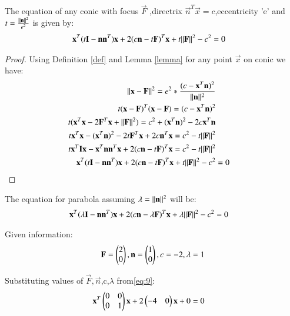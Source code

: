 \documentclass[journal,12pt,twocolumn]{IEEEtran}
\begin{document}
\begin{theorem}
The equation of any conic with focus $\vec{F}$ ,directrix $\vec{n}^T\vec{x}=c$,eccentricity 'e' and $t=\frac{\Vert\mathbf{n}\rVert^2}{e^2}$ is given by:
\begin{align}
\mathbf{x}^T(t\mathbf{I}-\mathbf{n}\mathbf{n}^T)\mathbf{x}+2(c\mathbf{n}-t\mathbf{F})^T\mathbf{x}+t\Vert\mathbf{F}\rVert^2-c^2&=0
\end{align}
\end{theorem}

\begin{proof}

Using Definition \ref{def} and Lemma \ref{lemma} for any point $\vec{x}$ on conic we have:
\begin{align}
\Vert\mathbf{x}-\mathbf{F}\rVert^2=e^2*\frac{({c-\mathbf{x}^T\mathbf{n}})^2}{\Vert\mathbf{n}\rVert^2}\label{eq:1} \\
t(\mathbf{x}-\mathbf{F})^T(\mathbf{x}-\mathbf{F})=(c-\mathbf{x}^T\mathbf{n})^2
\\
t(\mathbf{x}^T\mathbf{x}-2\mathbf{F}^T\mathbf{x}+\Vert\mathbf{F}\rVert^2)=c^2+(\mathbf{x}^T\mathbf{n})^2-2c\mathbf{x}^T\mathbf{n}\\
t\mathbf{x}^T\mathbf{x}-(\mathbf{x}^T\mathbf{n})^2-2t\mathbf{F}^T\mathbf{x}+2c\mathbf{n}^T\mathbf{x}=c^2-t\Vert\mathbf{F}\rVert^2\\
t\mathbf{x}^T\mathbf{I}\mathbf{x}-\mathbf{x}^T\mathbf{n}\mathbf{n}^T\mathbf{x}+2(c\mathbf{n}-t\mathbf{F})^T\mathbf{x}=c^2-t\Vert\mathbf{F}\rVert^2\\
\mathbf{x}^T(t\mathbf{I}-\mathbf{n}\mathbf{n}^T)\mathbf{x}+2(c\mathbf{n}-t\mathbf{F})^T\mathbf{x}+t\Vert\mathbf{F}\rVert^2-c^2&=0
\end{align}
\end{proof}
\begin{corollary}
The equation for parabola assuming $\lambda=\Vert\mathbf{n}\rVert^2$ will be: 
\begin{align}
\mathbf{x}^T(\lambda\mathbf{I}-\mathbf{n}\mathbf{n}^T)\mathbf{x}+2(c\mathbf{n}-\lambda\mathbf{F})^T\mathbf{x}+\lambda\Vert\mathbf{F}\rVert^2-c^2&=0\label{eq:8}
\end{align}
\end{corollary}
Given information:
\begin{align}
\mathbf{F}=\begin{pmatrix}2\\0\end{pmatrix},
\mathbf{n}=\begin{pmatrix}1\\0\end{pmatrix},
c=-2\label{eq:9},
\lambda=1
\end{align}


Substituting values of $\vec{F},\vec{n}$,c,$\lambda$ from\eqref{eq:9}:
\begin{align}
\mathbf{x}^T\begin{pmatrix}0&0\\0&1\end{pmatrix}\mathbf{x}+2\begin{pmatrix}-4&0\end{pmatrix}\mathbf{x}+0&=0\label{eq:11}
\end{align}
\end{document}
